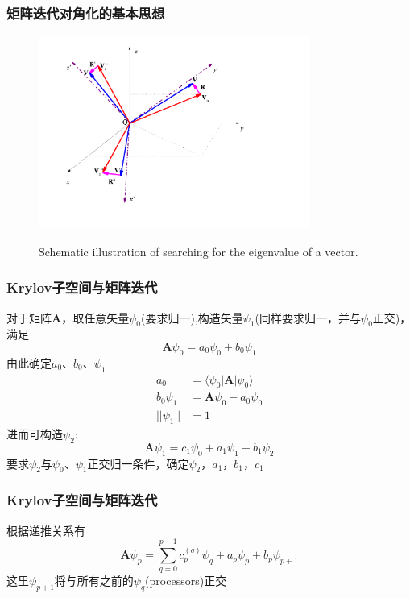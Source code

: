 {\frame
{
	\frametitle{矩阵迭代对角化的基本思想}
\begin{figure}[h!]
\centering
\includegraphics[height=2.5in,width=3.5in,viewport=0 0 850 590,clip]{Figures/Coordinate_transformation.png}
\label{Coordinate_transformation}
\caption{\tiny \textrm{Schematic illustration of searching for the eigenvalue of a vector.}}%
\end{figure}
}

\frame
{
	\frametitle{\textrm{Krylov}子空间与矩阵迭代}
	对于矩阵$\mathbf{A}$，取任意矢量$\psi_0$(要求归一),构造矢量$\psi_1$(同样要求归一，并与$\psi_0$正交)，满足
	\begin{displaymath}
		\mathbf{A}\psi_0=a_0\psi_0+b_0\psi_1
	\end{displaymath}
	由此确定$a_0$、$b_0$、$\psi_1$
	\begin{displaymath}
		\begin{aligned}
			a_0&=\langle\psi_0|\mathbf{A}|\psi_0\rangle\\
			b_0\psi_1&=\mathbf{A}\psi_0-a_0\psi_0\\
			||\psi_1||&=1
		\end{aligned}
	\end{displaymath}
	进而可构造$\psi_2$:
	\begin{displaymath}
		\mathbf{A}\psi_1=c_1\psi_0+a_1\psi_1+b_1\psi_2
	\end{displaymath}
	要求$\psi_2$与$\psi_0$、$\psi_1$正交归一条件，确定$\psi_2$，$a_1$，$b_1$，$c_1$
}

\frame
{
	\frametitle{\textrm{Krylov}子空间与矩阵迭代}
	根据递推关系有
	\begin{displaymath}
		\mathbf{A}\psi_p=\sum_{q=0}^{p-1}c_p^{(q)}\psi_q+a_p\psi_p+b_p\psi_{p+1}
	\end{displaymath}
	这里$\psi_{p+1}$将与所有之前的$\psi_q$(\textrm{processors})正交

}}
